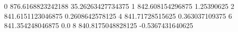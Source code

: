 0 876.6168823242188 35.26263427734375
1 842.608154296875 1.25390625
2 841.6151123046875 0.2608642578125
4 841.71728515625 0.363037109375
6 841.354248046875 0.0
8 840.8175048828125 -0.5367431640625
